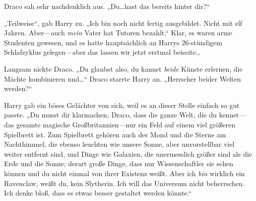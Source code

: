 Draco sah sehr nachdenklich aus. „Du…hast das bereits hinter dir?“

„Teilweise“, gab Harry zu. „Ich bin noch nicht fertig ausgebildet. Nicht mit elf Jahren. Aber—auch \emph{mein} Vater hat Tutoren bezahlt.“ Klar, es waren arme Studenten gewesen, und es hatte hauptsächlich an Harrys 26-stündigem Schlafzyklus gelegen—aber das lassen wir jetzt erstmal beiseite…

Langsam nickte Draco. „Du glaubst also, du kannst \emph{beide} Künste erlernen, die Mächte kombinieren und…“ Draco starrte Harry an. „Herrscher beider Welten werden?“

Harry gab ein böses Gelächter von sich, weil es an dieser Stelle einfach so gut passte. „Du musst dir klarmachen, Draco, dass die ganze Welt, die du kennst—das gesamte magische Großbritannien—nur ein Feld auf einem viel größeren Spielbrett ist. Zum Spielbrett gehören auch der Mond und die Sterne am Nachthimmel, die ebenso leuchten wie unsere Sonne, aber unvorstellbar viel weiter entfernt sind, und Dinge wie Galaxien, die unermesslich größer sind als die Erde und die Sonne; derart große Dinge, dass nur Wissenschaftler sie sehen können und du nicht einmal von ihrer Existenz weißt. Aber ich \emph{bin} wirklich ein Ravenclaw, weißt du, kein Slytherin. Ich will das Universum nicht beherrschen. Ich denke bloß, dass es etwas besser gestaltet werden könnte.“

